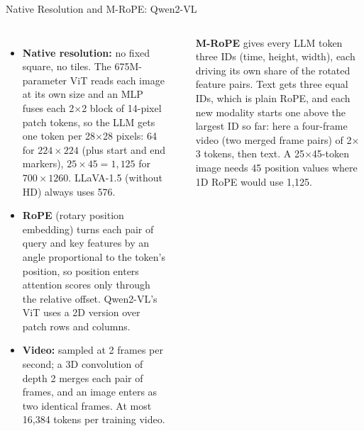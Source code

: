 \begin{frame}{Native Resolution and M-RoPE: Qwen2-VL}
  \begin{columns}[T,onlytextwidth]
      \begin{itemize}\footnotesize\itemsep0.3em
        \item \textbf{Native resolution:} no fixed square, no tiles. The 675M-parameter ViT reads each image at its own size and an MLP fuses each 2$\times$2 block of 14-pixel patch tokens, so the LLM gets one token per 28$\times$28 pixels: 64 for $224\times224$ (plus start and end markers), $25\times45 = 1{,}125$ for $700\times1260$. LLaVA-1.5 (without HD) always uses 576.
        \item \textbf{RoPE} (rotary position embedding) turns each pair of query and key features by an angle proportional to the token's position, so position enters attention scores only through the relative offset. Qwen2-VL's ViT uses a 2D version over patch rows and columns.
        \item \textbf{Video:} sampled at 2 frames per second; a 3D convolution of depth 2 merges each pair of frames, and an image enters as two identical frames. At most 16{,}384 tokens per training video.
      \end{itemize}
      \centering
      \vspace{0.2em}
      \\[0.4em]
      {\scriptsize\raggedright \textbf{M-RoPE} gives every LLM token three IDs (time, height, width), each driving its own share of the rotated feature pairs. Text gets three equal IDs, which is plain RoPE, and each new modality starts one above the largest ID so far: here a four-frame video (two merged frame pairs) of 2$\times$3 tokens, then text. A 25$\times$45-token image needs 45 position values where 1D RoPE would use 1{,}125.\par}

\end{columns}
\end{frame}
